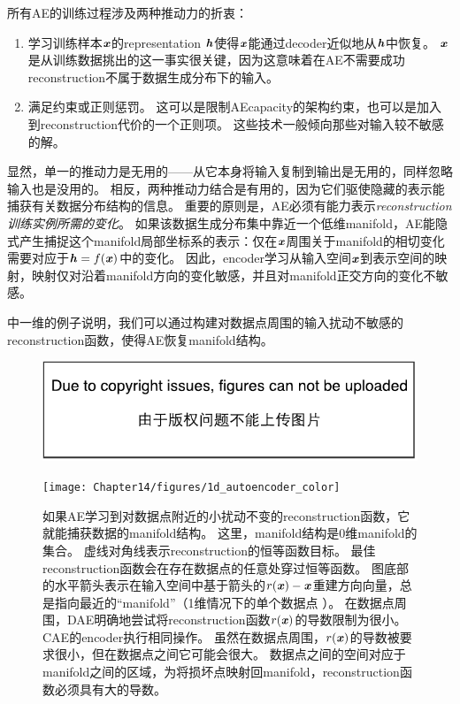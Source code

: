 
所有\gls{AE}的训练过程涉及两种推动力的折衷：
\begin{enumerate}
 \item 学习训练样本$\boldsymbol{\mathit{x}}$的\gls{representation} $\boldsymbol{\mathit{h}}$使得$\boldsymbol{\mathit{x}}$能通过\gls{decoder}近似地从$\boldsymbol{\mathit{h}}$中恢复。
$\boldsymbol{\mathit{x}}$是从训练数据挑出的这一事实很关键，因为这意味着在\gls{AE}不需要成功\gls{reconstruction}不属于数据生成分布下的输入。
 \item 满足约束或正则惩罚。
这可以是限制\gls{AE}\gls{capacity}的架构约束，也可以是加入到\gls{reconstruction}代价的一个正则项。
这些技术一般倾向那些对输入较不敏感的解。
\end{enumerate}


显然，单一的推动力是无用的——从它本身将输入复制到输出是无用的，同样忽略输入也是没用的。
相反，两种推动力结合是有用的，因为它们驱使隐藏的表示能捕获有关数据分布结构的信息。
重要的原则是，\gls{AE}必须有能力表示\emph{\gls{reconstruction}训练实例所需的变化}。
如果该数据生成分布集中靠近一个低维\gls{manifold}，\gls{AE}能隐式产生捕捉这个\gls{manifold}局部坐标系的表示：仅在$\boldsymbol{\mathit{x}}$周围关于\gls{manifold}的相切变化需要对应于$\boldsymbol{\mathit{h}}=f(\boldsymbol{\mathit{x}})$中的变化。
因此，\gls{encoder}学习从输入空间$\boldsymbol{\mathit{x}}$到表示空间的映射，映射仅对沿着\gls{manifold}方向的变化敏感，并且对\gls{manifold}正交方向的变化不敏感。


中一维的例子说明，我们可以通过构建对数据点周围的输入扰动不敏感的\gls{reconstruction}函数，使得\gls{AE}恢复\gls{manifold}结构。


\begin{figure}[!htb]
\ifOpenSource
\centerline{\includegraphics{figure.pdf}}
\else
\centerline{\texttt{[image: Chapter14/figures/1d\_autoencoder\_color]}}
\fi
\caption{如果\gls{AE}学习到对数据点附近的小扰动不变的\gls{reconstruction}函数，它就能捕获数据的\gls{manifold}结构。
这里，\gls{manifold}结构是0维\gls{manifold}的集合。
虚线对角线表示\gls{reconstruction}的恒等函数目标。 
最佳\gls{reconstruction}函数会在存在数据点的任意处穿过恒等函数。
图底部的水平箭头表示在输入空间中基于箭头的$r(\boldsymbol{\mathit{x}})-\boldsymbol{\mathit{x}}$重建方向向量，总是指向最近的``\gls{manifold}''（1维情况下的单个数据点 ）。
在数据点周围，\gls{DAE}明确地尝试将\gls{reconstruction}函数$r(\boldsymbol{\mathit{x}})$的导数限制为很小。
\gls{CAE}的\gls{encoder}执行相同操作。
虽然在数据点周围，$r(\boldsymbol{\mathit{x}})$的导数被要求很小，但在数据点之间它可能会很大。
数据点之间的空间对应于\gls{manifold}之间的区域，为将损坏点映射回\gls{manifold}，\gls{reconstruction}函数必须具有大的导数。
} \label{fig:chap14_1d_autoencoder_color}
\end{figure}

